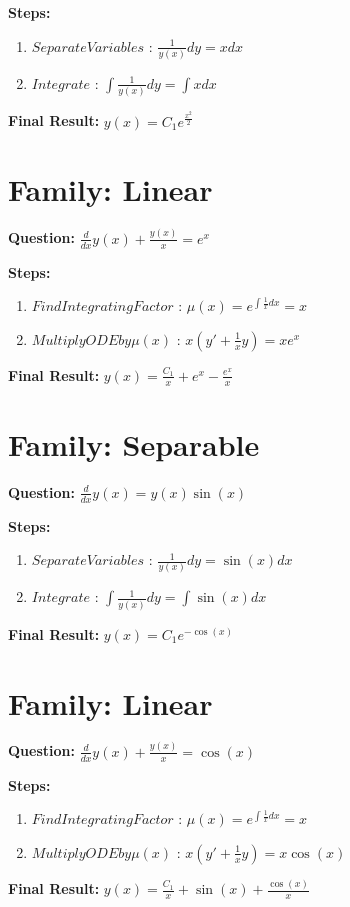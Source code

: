 \documentclass{article}
\begin{document}
\textbf{Steps:}
\begin{enumerate}
\item $Separate Variables$ :  $\frac{1}{y{\left(x \right)}} dy = x dx$
\item $Integrate$ :  $\int \frac{1}{y{\left(x \right)}} dy = \int x dx$
\end{enumerate}
\textbf{Final Result:} $y{\left(x \right)} = C_{1} e^{\frac{x^{2}}{2}}$

\section*{Family: Linear}
\textbf{Question:} $\frac{d}{d x} y{\left(x \right)} + \frac{y{\left(x \right)}}{x} = e^{x}$

\textbf{Steps:}
\begin{enumerate}
\item $Find Integrating Factor$ :  $\mu(x) = e^{\int \frac{1}{x} dx} = x$
\item $Multiply ODE by \mu(x)$ :  $x(y' + \frac{1}{x}y) = x e^{x}$
\end{enumerate}
\textbf{Final Result:} $y{\left(x \right)} = \frac{C_{1}}{x} + e^{x} - \frac{e^{x}}{x}$

\section*{Family: Separable}
\textbf{Question:} $\frac{d}{d x} y{\left(x \right)} = y{\left(x \right)} \sin{\left(x \right)}$

\textbf{Steps:}
\begin{enumerate}
\item $Separate Variables$ :  $\frac{1}{y{\left(x \right)}} dy = \sin{\left(x \right)} dx$
\item $Integrate$ :  $\int \frac{1}{y{\left(x \right)}} dy = \int \sin{\left(x \right)} dx$
\end{enumerate}
\textbf{Final Result:} $y{\left(x \right)} = C_{1} e^{- \cos{\left(x \right)}}$

\section*{Family: Linear}
\textbf{Question:} $\frac{d}{d x} y{\left(x \right)} + \frac{y{\left(x \right)}}{x} = \cos{\left(x \right)}$

\textbf{Steps:}
\begin{enumerate}
\item $Find Integrating Factor$ :  $\mu(x) = e^{\int \frac{1}{x} dx} = x$
\item $Multiply ODE by \mu(x)$ :  $x(y' + \frac{1}{x}y) = x \cos{\left(x \right)}$
\end{enumerate}
\textbf{Final Result:} $y{\left(x \right)} = \frac{C_{1}}{x} + \sin{\left(x \right)} + \frac{\cos{\left(x \right)}}{x}$
\end{document}
